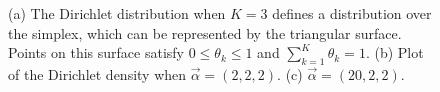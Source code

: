 \documentclass[graybox, envcountchap, twocolumn]{styles/svmult}
\begin{document}
\begin{figure}[hbtp]
\caption{(a) The Dirichlet distribution when $K=3$ defines a distribution over the simplex, which can be represented by the triangular surface. Points on this surface satisfy $0 \leq \theta_k \leq 1$ and $\sum_{k=1}^K \theta_k=1$. (b) Plot of the Dirichlet density when $\vec{\alpha}=(2,2,2)$. (c) $\vec{\alpha}=(20,2,2)$.}
\label{fig:3d-Dirichlet} 
\end{figure}
\end{document}
